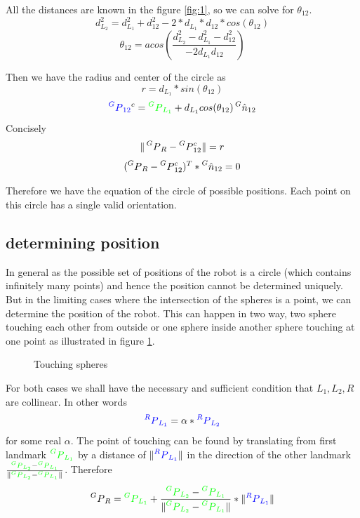 \documentclass[12pt]{article}
\newcommand{\dlo}{d_{L_1}}
\newcommand{\dlt}{d_{L_2}}
\newcommand{\dlot}{d_{12}}
\newcommand{\xpy}[2]{\prescript{#1}{}{P}_{#2}}
\newcommand{\gxpy}[2]{{\color{green} \prescript{#1}{}{P}_{#2}}}
\newcommand{\bxpy}[2]{{\color{blue} \prescript{#1}{}{P}_{#2}}}
\begin{document}
All the distances are known in the figure \ref{fig:1}, so we can solve for $\theta_{12}$.
\[
  \dlt^2 = \dlo^2 + \dlot^2 - 2 * \dlo * \dlot * cos(\theta_{12})
\]
\[
  \theta_{12} = acos(\frac{\dlt^2 - \dlo^2 - \dlot^2}{-2\dlo\dlot})
\]

Then we have the radius and center of the circle as
\[
  r = \dlo * sin(\theta_{12})
\]
\[
  \bxpy{G}{12}^c = \gxpy{G}{L_1} + \dlo cos(\theta_{12}) \prescript{G}{}{\hat{n}}_{12}
\]
Concisely
\[
  \Vert \xpy{G}{R} - \xpy{G}{12}^c \Vert = r
\]
\[
  (\xpy{G}{R} - \xpy{G}{12}^c)^T * \prescript{G}{}{\hat{n}}_{12} = 0
\]

Therefore we have the equation of the circle of possible positions.
Each point on this circle has a single valid orientation.

\subsection*{determining position}
In general as the possible set of positions of the robot is a circle (which contains infinitely many points) and hence the position cannot be determined uniquely.
But in the limiting cases where the intersection of the spheres is a point, we can determine the position of the robot.
This can happen in two way, two sphere touching each other from outside or one sphere inside another sphere touching at one point as illustrated in figure \ref{fig:2}.

\def\ringa{(0,0) circle (2)}
\def\ringb{(3,0) circle (1)}
\def\ringc{(5,0) circle (2)}
\def\ringd{(6,0) circle (1)}

\begin{figure}[h]
  \centering
  \caption{Touching spheres}
  \label{fig:2}
\end{figure}
For both cases we shall have the necessary and sufficient condition that $ L_1, L_2, R $ are collinear. In other words
\[
  \bxpy{R}{L_1} = \alpha * \bxpy{R}{L_2}
\]
for some real $\alpha$.
The point of touching can be found by translating from first landmark $ \gxpy{G}{L_1} $ by a distance of $ \Vert \bxpy{R}{L_1} \Vert $ in the direction of the other landmark $ \frac{\gxpy{G}{L_2} - \gxpy{G}{L_1}}{\Vert \gxpy{G}{L_2} - \gxpy{G}{L_1} \Vert} $. Therefore
\[
  \xpy{G}{R} = \gxpy{G}{L_1} + \frac{\gxpy{G}{L_2} - \gxpy{G}{L_1}}{\Vert \gxpy{G}{L_2} - \gxpy{G}{L_1} \Vert} * \Vert \bxpy{R}{L_1} \Vert
\]
\end{document}

